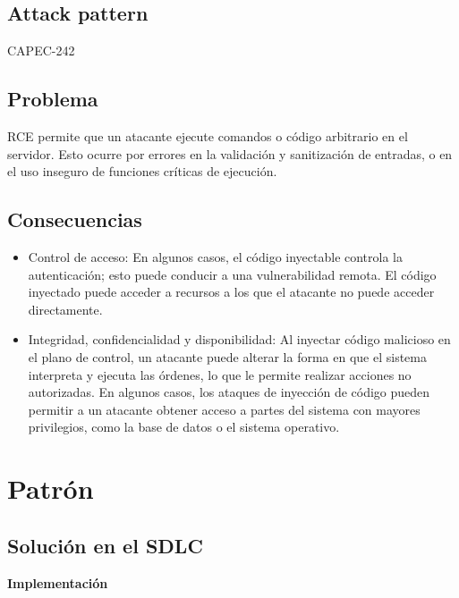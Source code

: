 \subsection*{Attack pattern}
CAPEC-242
\subsection*{Problema}
RCE permite que un atacante ejecute comandos o código arbitrario en el servidor. Esto ocurre por errores en la validación y sanitización de entradas, o en el uso inseguro de funciones críticas de ejecución.
\subsection*{Consecuencias}
\begin{itemize}
    \item Control de acceso: En algunos casos, el código inyectable controla la autenticación; esto puede conducir a una vulnerabilidad remota. El código inyectado puede acceder a recursos a los que el atacante no puede acceder directamente.
    \item Integridad, confidencialidad y disponibilidad: Al inyectar código malicioso en el plano de control, un atacante puede alterar la forma en que el sistema interpreta y ejecuta las órdenes, lo que le permite realizar acciones no autorizadas. En algunos casos, los ataques de inyección de código pueden permitir a un atacante obtener acceso a partes del sistema con mayores privilegios, como la base de datos o el sistema operativo. 
\end{itemize}

\section{Patrón}

\subsection*{Solución en el SDLC}

\textbf{Implementación}

